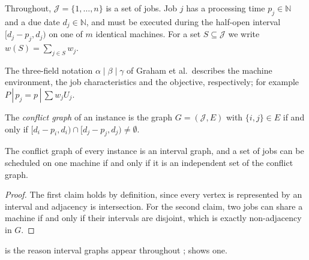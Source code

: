 

Throughout, $\mathcal{J}=\{1,\ldots,n\}$ is a set of jobs.
Job $j$ has a processing time $p_j\in\mathbb{N}$ and a due date $d_j\in\mathbb{N}$, and must be executed during the half-open interval $[d_j-p_j,d_j)$ on one of $m$ identical machines.
For a set $S\subseteq\mathcal{J}$ we write $w(S)=\sum_{j\in S}w_j$.

The three-field notation $\alpha\mid\beta\mid\gamma$ of Graham et al.\ describes the machine environment, the job characteristics and the objective, respectively; for example $P\,|\,p_j=p\,|\,\sum w_jU_j$.


\begin{definition}
\label{def:conflictgraph}\hypertarget{target:def:conflictgraph}{}%
The \emph{conflict graph} of an instance is the graph $G=(\mathcal{J},E)$ with $\{i,j\}\in E$ if and only if $[d_i-p_i,d_i)\cap[d_j-p_j,d_j)\neq\emptyset$.
\end{definition}

\begin{lemma}
\label{lem:interval}
The conflict graph of every instance is an interval graph, and a set of jobs can be scheduled on one machine if and only if it is an independent set of the conflict graph.
\end{lemma}

\begin{proof}
The first claim holds by definition, since every vertex is represented by an interval and adjacency is intersection.
For the second claim, two jobs can share a machine if and only if their intervals are disjoint, which is exactly non-adjacency in $G$.
\end{proof}

 is the reason interval graphs appear throughout ;  shows one.

